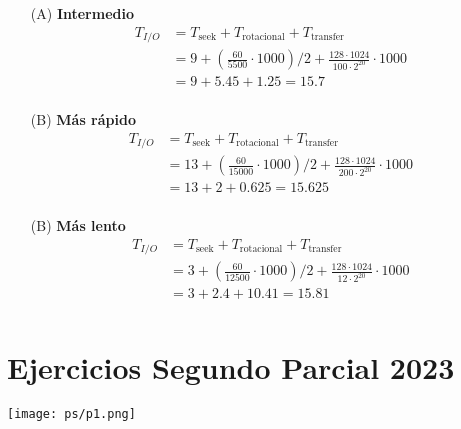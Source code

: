 \documentclass[openany]{book}
\begin{document}
\begin{rta}
    \begin{itemize}
        \item[(A)] \textbf{Intermedio}
        \begin{align*}
            T_{I/O} &= T_{\text{seek}} + T_{\text{rotacional}} + T_{\text{transfer}} \\
            &= 9 + \left( \frac{60}{5500} \cdot 1000  \right)/2 + \frac{128 \cdot 1024}{100 \cdot 2^{20}} \cdot 1000 \\
            &= 9 + 5.45 + 1.25 = 15.7 \\
        \end{align*}
        \item[(B)] \textbf{Más rápido}
        \begin{align*}
            T_{I/O} &= T_{\text{seek}} + T_{\text{rotacional}} + T_{\text{transfer}} \\
            &= 13 + \left( \frac{60}{15000} \cdot 1000  \right)/2 + \frac{128 \cdot 1024}{200 \cdot 2^{20}} \cdot 1000 \\
            &= 13 + 2 + 0.625 = 15.625 \\
        \end{align*} 
        \item[(B)] \textbf{Más lento}
        \begin{align*}
            T_{I/O} &= T_{\text{seek}} + T_{\text{rotacional}} + T_{\text{transfer}} \\
            &= 3 + \left( \frac{60}{12500} \cdot 1000  \right)/2 + \frac{128 \cdot 1024}{12 \cdot 2^{20}} \cdot 1000 \\
            &= 3 + 2.4 +  10.41 = 15.81 \\
        \end{align*}
    \end{itemize}    
\end{rta}

\section*{Ejercicios Segundo Parcial 2023}
\texttt{[image: ps/p1.png]}
\end{document}
